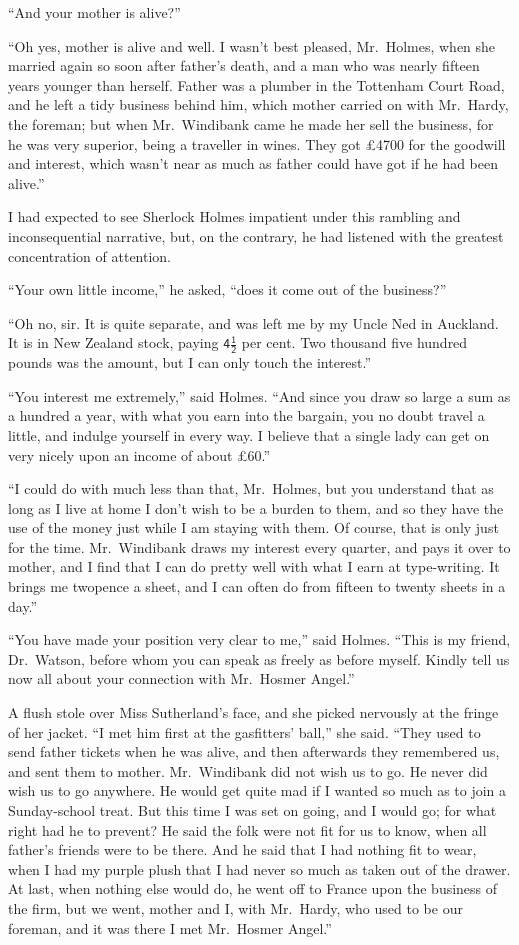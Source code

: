 “And your mother is alive?”

“Oh yes, mother is alive and well. I wasn’t best pleased,
Mr.~Holmes, when she married again so soon after father’s
death, and a man who was nearly fifteen years younger than
herself. Father was a plumber in the Tottenham Court Road,
and he left a tidy business behind him, which mother carried
on with Mr.~Hardy, the foreman; but when Mr.~Windibank
came he made her sell the business, for he was very superior,
being a traveller in wines. They got £4700 for the
goodwill and interest, which wasn’t near as much as father could
have got if he had been alive.”

I had expected to see Sherlock Holmes impatient under this
rambling and inconsequential narrative, but, on the contrary,
he had listened with the greatest concentration of attention.

“Your own little income,” he asked, “does it come out of
the business?”

“Oh no, sir. It is quite separate, and was left me by my
Uncle Ned in Auckland. It is in New Zealand stock, paying
$\mathsf{4\frac{1}{2}}$ per cent. Two thousand five hundred pounds was the
amount, but I can only touch the interest.”

“You interest me extremely,” said Holmes. “And since
you draw so large a sum as a hundred a year, with what you
earn into the bargain, you no doubt travel a little, and indulge
yourself in every way. I believe that a single lady can get on
very nicely upon an income of about £60.”

“I could do with much less than that, Mr.~Holmes, but you
understand that as long as I live at home I don’t wish to be
a burden to them, and so they have the use of the money just
while I am staying with them. Of course, that is only just for
the time. Mr.~Windibank draws my interest every quarter,
and pays it over to mother, and I find that I can do pretty
well with what I earn at type-writing. It brings me twopence
a sheet, and I can often do from fifteen to twenty sheets in a
day.”

“You have made your position very clear to me,” said
Holmes. “This is my friend, Dr.\ Watson, before whom you
can speak as freely as before myself. Kindly tell us now all
about your connection with Mr.~Hosmer Angel.”

A flush stole over Miss Sutherland’s face, and she picked
nervously at the fringe of her jacket. “I met him first at the
gasfitters’ ball,” she said. “They used to send father tickets
when he was alive, and then afterwards they remembered us,
and sent them to mother. Mr.~Windibank did not wish us to
go. He never did wish us to go anywhere. He would get quite
mad if I wanted so much as to join a Sunday-school treat.
But this time I was set on going, and I would go; for what
right had he to prevent? He said the folk were not fit for us
to know, when all father’s friends were to be there. And he
said that I had nothing fit to wear, when I had my purple
plush that I had never so much as taken out of the drawer.
At last, when nothing else would do, he went off to France
upon the business of the firm, but we went, mother and I, with
Mr.~Hardy, who used to be our foreman, and it was there I
met Mr.~Hosmer Angel.”

